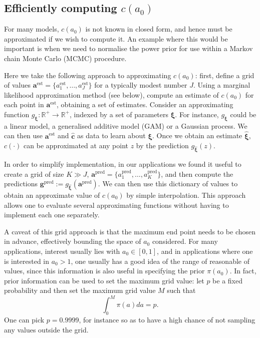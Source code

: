 \documentclass[a4paper, notitlepage, 11pt]{article}
\begin{document}
\subsection{Efficiently computing $c(a_0)$}
\label{sec:efficient_computation_ca0}

For many models, $c(a_0)$ is not known in closed form, and hence must be approximated if we wish to compute it.
An example where this would be important is when we need to normalise the power prior for use within a Markov chain Monte Carlo (MCMC) procedure.

Here we take the following approach to approximating $c(a_0)$: first, define a grid of values $\boldsymbol a^{\text{est}} = \{ a^{\text{est}}_1, \ldots, a^{\text{est}}_J \}$ for a typically modest number $J$.
Using a marginal likelihood approximation method (see below), compute an estimate of $c(a_0)$ for each point in $\boldsymbol a^{\text{est}}$, obtaining a set of estimates.
Consider an approximating function $g_{\boldsymbol\xi} : \mathbb{R}^+ \to \mathbb{R}^+$, indexed by a set of parameters $\boldsymbol\xi$.
For instance, $g_{\boldsymbol\xi}$ could be a linear model, a generalised additive model (GAM) or a Gaussian process.
We can then use  $\boldsymbol a^{\text{est}}$ and $\hat{\boldsymbol c}$ as data to learn about $\boldsymbol\xi$.
Once we obtain an estimate  $\hat{\boldsymbol \xi}$, $c(\cdot)$ can be approximated at any point $z$ by the prediction $g_{\hat{\boldsymbol \xi}}(z)$.

In order to simplify implementation, in our applications we found it useful to create a grid of size $K \gg J$, $\boldsymbol a^{\text{pred}} = \{ a^{\text{pred}}_1, \ldots, a^{\text{pred}}_K \}$, and then compute the predictions $\boldsymbol g^{\text{pred}} := g_{\hat{\boldsymbol \xi}}( \boldsymbol a^{\text{pred}} )$.
We can then use this dictionary of values to obtain an approximate value of $c(a_0)$ by simple interpolation.
This approach allows one to evaluate several approximating functions without having to implement each one separately.

A caveat of this grid approach is that the maximum end point needs to be chosen in advance, effectively bounding the space of $a_0$ considered. 
For many applications, interest usually lies with $a_0 \in [0, 1]$, and in applications where one is interested in $a_0 > 1$, one usually has a good idea of the range of reasonable of values, since this information is also useful in specifying the prior $\pi(a_0)$.
In fact, prior information can be used to set the maximum grid value: let $p$ be a fixed probability and then set the maximum grid value $M$ such that
\[ \int_0^M \pi(a) da = p. \]
One can pick $p = 0.9999$, for instance so as to have a high chance of not sampling any values outside the grid.
\end{document}
